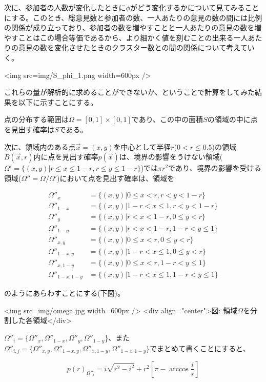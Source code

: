 次に、参加者の人数が変化したときに$\phi$がどう変化するかについて見てみることにする。このとき、総意見数と参加者の数、一人あたりの意見の数の間には比例の関係が成り立っており、参加者の数を増やすことと一人あたりの意見の数を増やすことはこの場合等価であるから、より細かく値を刻むことの出来る一人あたりの意見の数を変化させたときのクラスター数との間の関係について考えていく。

<img src=img/S_phi_1.png width=600px />

これらの量が解析的に求めることができないか、ということで計算をしてみた結果を以下に示すことにする。

点の分布する範囲は$\Omega = [0,1]\times [0,1]$であり、この中の面積$S$の領域の中に点を見出す確率は$S$である。

次に、領域内のある点$\vec x=(x,y)$を中心として半径$r$($0 < r \le 0.5$)の領域$B(\vec x, r)$内に点を見出す確率$p(\vec x)$は、境界の影響をうけない領域($\Omega ' = \{(x,y) | r \le x \le 1-r, r \le y \le 1-r \}$)では$\pi r^{2}$であり、境界の影響を受ける領域($\Omega'' = \Omega / \Omega'$)において点を見出す確率は、領域を

$$\begin{align}
\Omega''_{x} &= \{(x,y) | 0 \le x < r, r< y < 1-r\} \\
\Omega''_{1-x} &= \{(x,y) | 1-r < x \le 1, r< y < 1-r\} \\
\Omega''_{y} &= \{(x,y) | r < x < 1-r, 0 \le y < r\} \\
\Omega''_{1-y} &= \{(x,y) | r < x < 1-r, 1-r < y \le 1\} \\
\Omega''_{x,y} &= \{(x,y) | 0 \le x < r, 0 \le y < r\} \\
\Omega''_{1-x,y} &= \{(x,y) | 1-r < x \le 1, 0 \le y < r\} \\
\Omega''_{x,1-y} &= \{(x,y) | 0 \le x < r, 1-r < y \le 1\} \\
\Omega''_{1-x, 1-y} &= \{(x,y) | 1-r < x \le 1, 1-r < y \le 1\}
\end{align}$$

のようにあらわすことにする(下図)。

<img src=img/omega.jpg width=600px />
<div align="center">図: 領域$\Omega$を分割した各領域</div>

$\Omega''_{i} = \{\Omega''_{x}, \Omega''_{1-x}, \Omega''_{y}, \Omega''_{1-y}$\}、また$\Omega''_{i,j} = \{\Omega''_{x,y}, \Omega''_{1-x,y}, \Omega''_{x,1-y}, \Omega''_{1-x,1-y}\}$でまとめて書くことにすると、

$$p(r)_{\Omega''_{i}} = i \sqrt{r^{2}-i^{2}} + r^{2} \left[ \pi -\arccos \frac{i}{r} \right]$$

